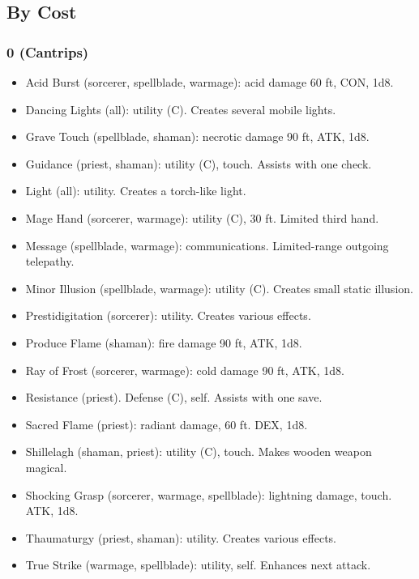 
\subsection{By Cost}

\subsubsection{0 (Cantrips)}
\begin{itemize}
\item Acid Burst (sorcerer, spellblade, warmage): acid damage 60 ft, CON, 1d8.
\item Dancing Lights (all): utility (C). Creates several mobile lights.
\item Grave Touch (spellblade, shaman): necrotic damage 90 ft, ATK, 1d8.
\item Guidance (priest, shaman): utility (C), touch. Assists with one check.
\item Light (all): utility. Creates a torch-like light.
\item Mage Hand (sorcerer, warmage): utility (C), 30 ft. Limited third hand.
\item Message (spellblade, warmage): communications. Limited-range outgoing telepathy.
\item Minor Illusion (spellblade, warmage): utility (C). Creates small static illusion.
\item Prestidigitation (sorcerer): utility. Creates various effects.
\item Produce Flame (shaman): fire damage 90 ft, ATK, 1d8.
\item Ray of Frost (sorcerer, warmage): cold damage 90 ft, ATK, 1d8.
\item Resistance (priest). Defense (C), self. Assists with one save.
\item Sacred Flame (priest): radiant damage, 60 ft. DEX, 1d8.
\item Shillelagh (shaman, priest): utility (C), touch. Makes wooden weapon magical.
\item Shocking Grasp (sorcerer, warmage, spellblade): lightning damage, touch. ATK, 1d8.
\item Thaumaturgy (priest, shaman): utility. Creates various effects.
\item True Strike (warmage, spellblade): utility, self. Enhances next attack.
\end{itemize}

